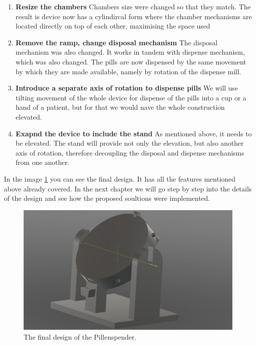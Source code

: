 \begin{enumerate}
	\item{\textbf{Resize the chambers}} Chambers size were changed so that they match. The result is device now has a cylindircal form where the chamber mechanisms are located directly on top of each other, maximising the space used
	\item{\textbf{Remove the ramp, change disposal mechanism}} The disposal mechanism was also changed. It works in tandem with dispense mechanism, which was also changed. The pills are now dispensed by the same movement by which they are made available, namely by rotation of the dispense mill. 
	\item{\textbf{Introduce a separate axis of rotation to dispense pills}} We will use tilting movement of the whole device for dispense of the pills into a cup or a hand of a patient, but for that we would nave the whole construction elevated.
	\item{\textbf{Exapnd the device to include the stand}} As mentioned above, it needs to be elevated. The stand will provide not only the elevation, but also another axis of rotation, therefore decoupling the disposal and dispense mechanisms from one another.
\end{enumerate}
In the image \ref{fig:screenshot5} you can see the final design. It has all the features mentioned above already covered. In the next chapter we will go step by step into the details of the design and see how the proposed soultions were implemented.
\begin{figure}[]
	\centering
	\includegraphics[width=0.6\linewidth]{Figures/Screenshot_5}
	\caption[Final result]{The final design of the Pillenspender.}
	\label{fig:screenshot5}
\end{figure}


